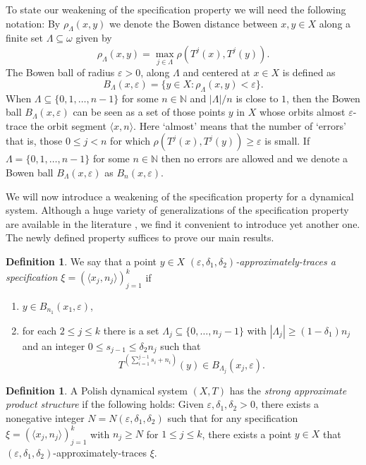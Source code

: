 \documentclass{amsart}
\theoremstyle{definition}
\newtheorem{defn}[thm]{Definition}
\newcommand{\eps}{\varepsilon}
\newcommand{\N}{\mathbb{N}}
\begin{document}
To state our weakening of the specification property we will need the following notation:
By $\rho_\Lambda(x,y)$ we denote the Bowen distance  between $x,y\in X$ along a finite set
$\Lambda\subseteq \omega$ given by
\[
\rho_\Lambda(x,y)=\max_{j\in\Lambda} \rho(T^j(x),T^j(y)).
\]
The Bowen ball of radius $\eps>0$, along $\Lambda$ and centered at $x\in X$ is defined as
\[
B_\Lambda(x,\eps)=\{y\in X:\rho_\Lambda(x,y)<\eps\}.
\]
When $\Lambda\subseteq \{0,1,\ldots,n-1\}$ for some $n\in\N$ and
$|\Lambda|/n$ is close to $1$, then the Bowen ball $B_\Lambda(x,\eps)$
can be seen as a set of those points $y$ in $X$ whose orbits almost
$\eps$-trace the orbit segment $\langle x,n\rangle$. Here `almost'
means that the number of `errors' that is, those $0\le j<n$ for which
$\rho( T^j(x),T^j(y))\ge \eps$ is small. If
$\Lambda=\{0,1,\ldots,n-1\}$ for some $n\in\N$ then no errors are
allowed and we denote a Bowen ball $B_\Lambda(x,\eps)$ as
$B_n(x,\eps)$.




We will now introduce a weakening of the specification property
for a dynamical system.
Although a huge variety of generalizations of the specification
property are available in the literature \cite{KLO}, we find it convenient to
introduce yet another one. The newly defined property suffices to prove our main results.


\begin{defn}\label{def:faithful2}
We say that a point $y\in X$ \emph{$(\eps,\delta_1,\delta_2)$-approximately-traces a specification $\xi=(\langle x_j,n_j\rangle)_{j=1}^k$} if
\begin{enumerate}
\item $y\in B_{n_1}(x_1,\eps)$,
\item for each $2\le j \le k$ there is a set $\Lambda_{j}\subseteq \{0,\ldots,n_{j}-1\}$
with $|\Lambda_{j}|\ge (1 - \delta_1) n_{j} $ and an
integer $0\le s_{j-1}\le \delta_2 n_{j}$ such that
\[
T^{(\sum_{i=1}^{j-1}s_i+n_i)}(y)\in B_{\Lambda_j}(x_j,\eps).
\]
\end{enumerate}
\end{defn}


\begin{defn} \label{def:saps}
A Polish dynamical system $(X, T )$ has the \emph{strong approximate product
structure} if the following holds: Given $\eps, \delta_1, \delta_2 > 0$,
there exists a nonegative integer $N=N(\eps,\delta_1,\delta_2)$
such that for any specification $\xi=(\langle x_j,n_j\rangle)_{j=1}^k$ with $n_j \ge N$ for $1 \le j \le k$,
there exists a point $y \in X$ that $(\eps,\delta_1,\delta_2)$-approximately-traces $\xi$.
\end{defn}
\end{document}

